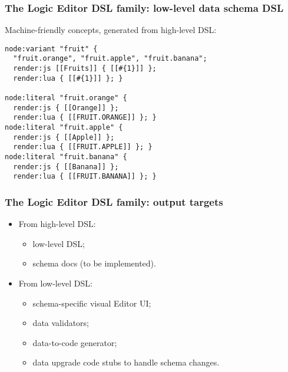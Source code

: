 \documentclass[handout]{beamer}
\begin{document}

\begin{frame}[fragile]

\frametitle{The Logic Editor DSL family: low-level data schema DSL}

Machine-friendly concepts, generated from high-level DSL:

\begin{verbatim}
node:variant "fruit" {
  "fruit.orange", "fruit.apple", "fruit.banana";
  render:js [[Fruits]] { [[#{1}]] };
  render:lua { [[#{1}]] }; }

node:literal "fruit.orange" {
  render:js { [[Orange]] };
  render:lua { [[FRUIT.ORANGE]] }; }
node:literal "fruit.apple" {
  render:js { [[Apple]] };
  render:lua { [[FRUIT.APPLE]] }; }
node:literal "fruit.banana" {
  render:js { [[Banana]] };
  render:lua { [[FRUIT.BANANA]] }; }
\end{verbatim}

\end{frame}


\begin{frame}

\frametitle{The Logic Editor DSL family: output targets}

\begin{itemize}
\item From high-level DSL:
  \begin{itemize}
  \item low-level DSL;
  \item schema docs (to be implemented).
  \end{itemize}
\item From low-level DSL:
  \begin{itemize}
  \item schema-specific visual Editor UI;
  \item data validators;
  \item data-to-code generator;
  \item data upgrade code stubs to handle schema changes.
  \end{itemize}
\end{itemize}

\end{frame}

\end{document}

